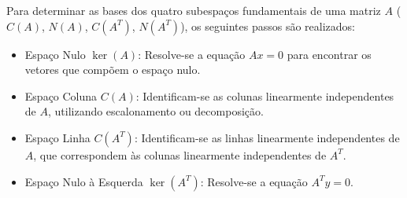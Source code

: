 \begin{resolution}
  Para determinar as bases dos quatro subespaços fundamentais de uma matriz \( A \) (\( C(A) \), \( N(A) \), \( C(A^T) \), \( N(A^T) \)), os seguintes passos são realizados:

  \begin{itemize}
    \item Espaço Nulo \( \operatorname{ker}(A) \): Resolve-se a equação \( A x = 0 \) para encontrar os vetores que compõem o espaço nulo.
    \item Espaço Coluna \( C(A) \): Identificam-se as colunas linearmente independentes de \( A \), utilizando escalonamento ou decomposição.
    \item Espaço Linha \( C(A^T) \): Identificam-se as linhas linearmente independentes de \( A \), que correspondem às colunas linearmente independentes de \( A^T \).
    \item Espaço Nulo à Esquerda \( \operatorname{ker}(A^T) \): Resolve-se a equação \( A^T y = 0 \).
  \end{itemize}


\end{resolution}

